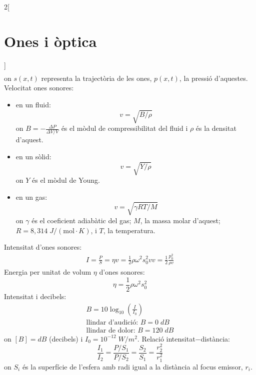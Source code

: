\documentclass[class=article,10pt,crop=false]{standalone}
\begin{document}
\begin{multicols}{2}[\section{Ones i òptica}]
\begin{gather*}
\end{gather*}
{\footnotesize on $s(x,t)$ representa la trajectòria de les ones, $p(x,t)$, la pressió d'aquestes.}\newline
Velocitat ones sonores:
\begin{itemize}
    \item en un fluid: $$v=\sqrt{B/\rho}$$ {\footnotesize on $B=-\frac{\Delta P}{\Delta V/V}$ és el mòdul de com\-pres\-si\-bi\-li\-tat del fluid i $\rho$ és la densitat d'aquest.}
    \item en un sòlid:
     $$v=\sqrt{Y/\rho}$$ {\footnotesize on $Y$ és el mòdul de Young.}
    \item en un gas:
    $$v=\sqrt{\gamma RT/M}$$ {\footnotesize on $\gamma$ és el coeficient adiabàtic del gas; $M$, la massa molar d'aquest; $R=8,314\;J/(\text{mol}\cdot K)$, i $T$, la temperatura.}
\end{itemize}
Intensitat d'ones sonores:
\begin{gather*}
    I=\frac{P}{S}=\eta v=\frac{1}{2}\rho\omega^2s_0^2v v=\frac{1}{2}\frac{p_0^2}{\rho v}
\end{gather*}
Energia per unitat de volum $\eta$ d'ones sonores:
$$\eta=\frac{1}{2}\rho\omega^2s_0^2$$
Intensitat i decibels:
\begin{gather*}
    B=10\log_{10}\left(\frac{I}{I_0}\right)\\
    \text{llindar d'audició: }B= 0\;dB\\
    \text{llindar de dolor: }B= 120\;dB
\end{gather*}
{\footnotesize on $[B]=dB$ (decibels) i $I_0=10^{-12}\;W/m^2$.}
Relació intensitat$-$distància: $$\frac{I_1}{I_2}=\frac{P/S_1}{P/S_2}=\frac{S_2}{S_1}=\frac{r_2^2}{r_1^2}$$ {\footnotesize on $S_i$ és la superfície de l'esfera amb radi igual a la distància al focus emissor, $r_i$.}

\end{multicols}
\end{document}
